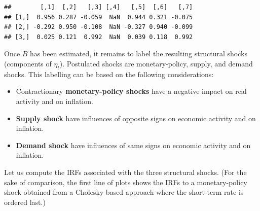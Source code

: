 \documentclass[
  12pt,
]{book}
\providecommand{\tightlist}{%
  \setlength{\itemsep}{0pt}\setlength{\parskip}{0pt}}
\theoremstyle{definition}
\theoremstyle{definition}
\theoremstyle{definition}
\theoremstyle{definition}
\theoremstyle{remark}
\begin{document}
\begin{verbatim}
##        [,1]  [,2]   [,3] [,4]   [,5]  [,6]   [,7]
## [1,]  0.956 0.287 -0.059  NaN  0.944 0.321 -0.075
## [2,] -0.292 0.950 -0.108  NaN -0.327 0.940 -0.099
## [3,]  0.025 0.121  0.992  NaN  0.039 0.118  0.992
\end{verbatim}

Once \(B\) has been estimated, it remains to label the resulting structural shocks (components of \(\eta_{t}\)). Postulated shocks are monetary-policy, supply, and demand shocks. This labelling can be based on the following considerations:

\begin{itemize}
\tightlist
\item
  Contractionary \textbf{monetary-policy shocks} have a negative impact on real activity and on inflation.
\item
  \textbf{Supply shock} have influences of opposite signs on economic activity and on inflation.
\item
  \textbf{Demand shock} have influences of same signs on economic activity and on inflation.
\end{itemize}

Let us compute the IRFs associated with the three structural shocks. (For the sake of comparison, the first line of plots shows the IRFs to a monetary-policy shock obtained from a Cholesky-based approach where the short-term rate is ordered last.)
\end{document}
